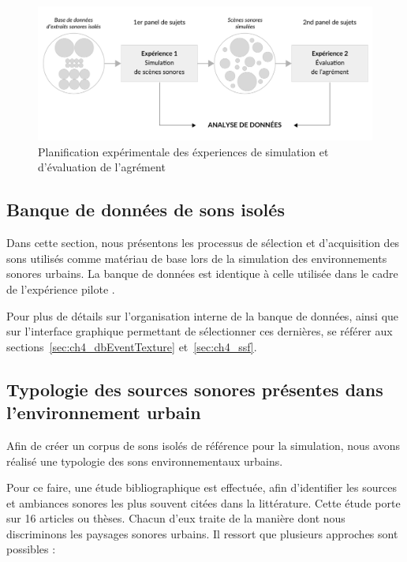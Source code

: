 \begin{figure}[t]
        \myfloatalign
        \includegraphics[width=.8\linewidth]{gfx/ch_5/5}
        \caption{Planification expérimentale des éxperiences de simulation et d'évaluation de l'agrément}\label{fig:xp1_2}
\end{figure}



\subsection{Banque de données de sons isolés}

Dans cette section, nous présentons les processus de sélection et d'acquisition des sons utilisés comme matériau de base lors de la simulation des environnements sonores urbains. La banque de données est identique à celle utilisée dans le cadre de l'expérience pilote \citep{lafay2013atiam,lafay2014new}. 

Pour plus de détails sur l'organisation interne de la banque de données, ainsi que sur l'interface graphique permettant de sélectionner ces dernières, se référer aux sections~\ref{sec:ch4_dbEventTexture} et~\ref{sec:ch4_ssf}.

\subsection{Typologie des sources sonores présentes dans l'environnement urbain}

Afin de créer un corpus de sons isolés de référence pour la simulation, nous avons réalisé une typologie des sons environnementaux urbains. 

Pour ce faire, une étude bibliographique est effectuée, afin d'identifier les sources et ambiances sonores les plus souvent citées dans la littérature. Cette étude porte sur 16 articles ou thèses. Chacun d'eux traite de la manière dont nous discriminons les paysages sonores urbains. Il ressort que plusieurs approches sont possibles :

